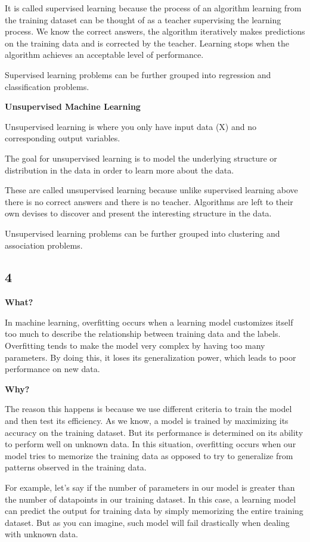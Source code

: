 \documentclass[letterpaper, 10 pt, conference]{ieeeconf}
\begin{document}
It is called supervised learning because the process of an algorithm learning from the training dataset can be thought of as a teacher supervising the learning process. We know the correct answers, the algorithm iteratively makes predictions on the training data and is corrected by the teacher. Learning stops when the algorithm achieves an acceptable level of performance.

Supervised learning problems can be further grouped into regression and classification problems.

\textbf{Unsupervised Machine Learning}

Unsupervised learning is where you only have input data (X) and no corresponding output variables.

The goal for unsupervised learning is to model the underlying structure or distribution in the data in order to learn more about the data.

These are called unsupervised learning because unlike supervised learning above there is no correct answers and there is no teacher. Algorithms are left to their own devises to discover and present the interesting structure in the data.

Unsupervised learning problems can be further grouped into clustering and association problems.

\subsection*{4}

\textbf{What?}

In machine learning, overfitting occurs when a learning model customizes itself too much to describe the relationship between training data and the labels. Overfitting tends to make the model very complex by having too many parameters. By doing this, it loses its generalization power, which leads to poor performance on new data.

\textbf{Why?}

The reason this happens is because we use different criteria to train the model and then test its efficiency. As we know, a model is trained by maximizing its accuracy on the training dataset. But its performance is determined on its ability to perform well on unknown data. In this situation, overfitting occurs when our model tries to memorize the training data as opposed to try to generalize from patterns observed in the training data.

For example, let’s say if the number of parameters in our model is greater than the number of datapoints in our training dataset. In this case, a learning model can predict the output for training data by simply memorizing the entire training dataset. But as you can imagine, such model will fail drastically when dealing with unknown data.
\end{document}
